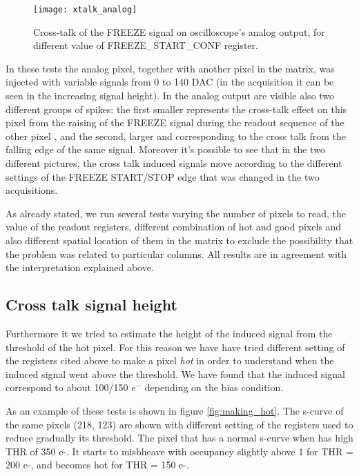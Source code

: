 \begin{figure}
\centering
\texttt{[image: xtalk\_analog]}
\caption{Cross-talk of the \textsc{FREEZE} signal on oscilloscope's analog output, for different value of \textsc{FREEZE\_START\_CONF} register.}
\label{fig:analog_xtalk}
\end{figure}

In these tests the analog pixel, together with another pixel in the matrix,  was injected with variable signals from 0 to 140 DAC (in the acquisition it can be seen in the increasing signal height). In the analog output are visible also two different groups of spikes: the first smaller represents the cross-talk effect on this pixel from the raising of the \textsc{FREEZE} signal during the readout sequence of the other pixel , and the second, larger and corresponding to the cross talk from the falling edge of the same signal.
Moreover it's possible to see that in the two different pictures, the cross talk induced signals move according to the different settings of the \textsc{FREEZE START/STOP} edge that was changed in the two acquisitions.





As already stated, we run several tests varying the number of pixels to read, the value of the readout registers, different combination of hot and good pixels and also different spatial location of them in the matrix to exclude the possibility that the problem was related to particular columns. All results are in agreement with the interpretation explained above.\\


\subsection{Cross talk signal height}

Furthermore it we tried to estimate the height of the induced signal from the threshold of the hot pixel. For this reason we have have tried different setting of the registers cited above to make a pixel \textit{hot} in order to understand when the induced signal went above the threshold. We have found that the induced signal correspond to about 100/150 $e^{-}$ depending on the bias condition.

As an example of these tests is shown in figure \autoref{fig:making_hot}. The s-curve of the same pixels (218, 123) are shown with different setting of the registers used to reduce gradually its threshold. The pixel that has a normal s-curve when has high THR of 350 e-. It starts to misbheave with occupancy slightly above 1 for THR = 200 e-, and becomes hot for  THR = 150 e-.

